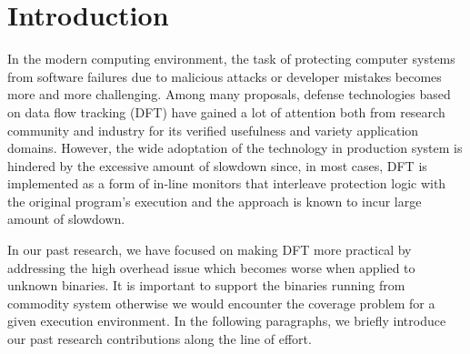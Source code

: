 \section{Introduction} \label{sec:intro}

In the modern computing environment, the task of protecting computer systems
from software failures due to malicious attacks or developer mistakes becomes
more and more challenging.
%
Among many proposals, defense technologies based on data flow tracking (DFT)
have gained a lot of attention both from research community and industry for
its verified usefulness and variety application domains. 
%
However, the wide adoptation of the technology in production system is hindered
by the excessive amount of slowdown since, in most cases, DFT is implemented as
a form of in-line monitors that interleave protection logic with the original
program's execution and the approach is known to incur large amount of
slowdown.

In our past research, we have focused on making DFT more practical by
addressing the high overhead issue which becomes worse when applied to unknown
binaries. It is important to support the binaries running from commodity system
otherwise we would encounter the coverage problem for a given execution
environment.
%
In the following paragraphs, we briefly introduce our past research
contributions along the line of effort.


